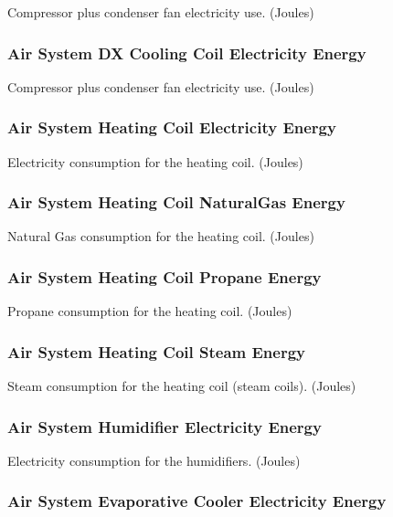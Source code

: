Compressor plus condenser fan electricity use. (Joules)

\subsubsection{Air System DX Cooling Coil Electricity Energy}\label{air-system-dx-cooling-coil-electric-energy}

Compressor plus condenser fan electricity use. (Joules)

\subsubsection{Air System Heating Coil Electricity Energy}\label{air-system-heating-coil-electric-energy}

Electricity consumption for the heating coil. (Joules)

\subsubsection{Air System Heating Coil NaturalGas Energy}\label{air-system-heating-coil-gas-energy}

Natural Gas consumption for the heating coil. (Joules)

\subsubsection{Air System Heating Coil Propane Energy}\label{air-system-heating-coil-propane-energy}

Propane consumption for the heating coil. (Joules)

\subsubsection{Air System Heating Coil Steam Energy}\label{air-system-heating-coil-steam-energy}

Steam consumption for the heating coil (steam coils). (Joules)

\subsubsection{Air System Humidifier Electricity Energy}\label{air-system-humidifier-electric-energy}

Electricity consumption for the humidifiers. (Joules)

\subsubsection{Air System Evaporative Cooler Electricity Energy}\label{air-system-evaporative-cooler-electric-energy}

